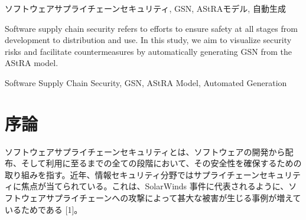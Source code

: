\documentclass[paper]{ieicej} %
\begin{document}
\begin{abstract}
近年、SolarWinds事件やTop.gg事件に代表されるソフトウェアサプライチェーン攻撃が急増し、甚大な被害をもたらしている。本研究では、複雑なサプライチェーンのセキュリティリスクを構造的に可視化し、対策の妥当性を評価する手法を提案する。具体的には、サプライチェーンセキュリティに特化したAStRAモデルを入力とし、安全性の論理的保証ケースを記述するGSN（Goal Structuring Notation）を自動生成する手法およびツールを開発した。本手法は、コンポーネント間の依存関係をAStRAモデルに基づき解析してGSNを生成する。また、各要素のセキュリティ要件に対する対策の有無を確認し、無防備な箇所を抽出する。提案手法をSolarWindsおよびTop.gg事件の事例に適用した結果、大規模なGSNを即座に出力し、攻撃の侵入経路となった箇所の不備を具体的に特定できることを確認した。本研究成果は、複雑なシステムにおけるサプライチェーンセキュリティの評価プロセスの効率化と信頼性向上に寄与するものである。
\end{abstract}

\begin{keyword}
ソフトウェアサプライチェーンセキュリティ, GSN, AStRAモデル, 自動生成
\end{keyword}

\begin{eabstract}
Software supply chain security refers to efforts to ensure safety at all stages from development to distribution and use. In this study, we aim to visualize security risks and facilitate countermeasures by automatically generating GSN from the AStRA model. 
\end{eabstract}

\begin{ekeyword}
Software Supply Chain Security, GSN, AStRA Model, Automated Generation
\end{ekeyword}

\maketitle

\section{序論}
ソフトウェアサプライチェーンセキュリティとは、ソフトウェアの開発から配布、そして利用に至るまでの全ての段階において、その安全性を確保するための取り組みを指す。近年、情報セキュリティ分野ではサプライチェーンセキュリティに焦点が当てられている。これは、SolarWinds 事件に代表されるように、ソフトウェアサプライチェーンへの攻撃によって甚大な被害が生じる事例が増えているためである [1]。
\end{document}
